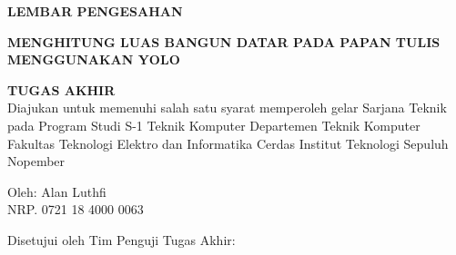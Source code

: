 \begin{center}
	\large
	\textbf{LEMBAR PENGESAHAN}
\end{center}

\thispagestyle{empty}

\begin{center}
	\textbf{MENGHITUNG LUAS BANGUN DATAR PADA PAPAN TULIS MENGGUNAKAN YOLO}
\end{center}

\begingroup
\small


\begin{center}
	\textbf{TUGAS AKHIR}
	\\Diajukan untuk memenuhi salah satu syarat memperoleh gelar Sarjana Teknik pada Program Studi S-1 Teknik Komputer Departemen Teknik Komputer Fakultas Teknologi Elektro dan Informatika Cerdas Institut Teknologi Sepuluh Nopember
\end{center}


\begin{center}
	Oleh: Alan Luthfi 
	\\NRP. 0721 18 4000 0063
\end{center}



\begin{center}
	Disetujui oleh Tim Penguji Tugas Akhir:
\end{center}


\begingroup
\setlength{\tabcolsep}{0pt}

